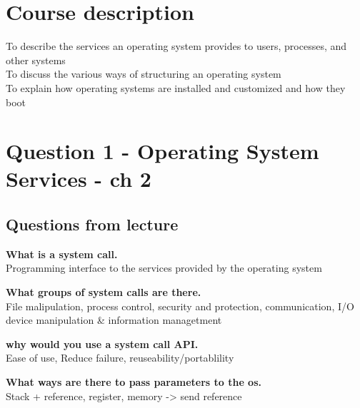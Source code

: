 \documentclass[a4paper,10pt,titlepage]{report}
\date{}
\begin{document}
\renewcommand{\thepage}{\roman{page}}%
\tableofcontents
\newpage
\setcounter{page}{1}
\renewcommand{\thepage}{\arabic{page}}
\section{Course description}
To describe the services an operating system provides to
users, processes, and other systems\\
To discuss the various ways of structuring an operating
system\\
To explain how operating systems are installed and
customized and how they boot\\
\newpage
\section{Question 1 - Operating System Services - ch 2}
\subsection{Questions from lecture}


\textbf{What is a system call.\\}
\hspace{10mm} Programming interface to the services provided by the operating system \\ \vspace{5mm}


\textbf{What groups of system calls are there. \\}
\hspace{10mm}File malipulation, process control, security and protection, communication, I/O device manipulation \& information managetment\\ \vspace{5mm}



\textbf{why would you use a system call API.\\}
\hspace{10mm}Ease of use, Reduce failure, reuseability/portablility \\ \vspace{5mm}


\textbf{What ways are there to pass parameters to the os.\\}
\hspace{10mm} Stack + reference, register, memory -> send reference \\  \vspace{5mm}
\end{document}
